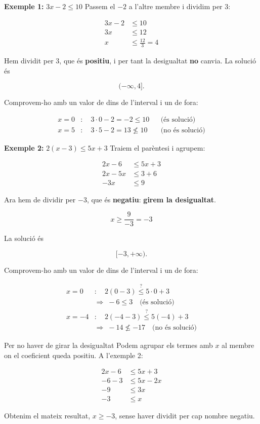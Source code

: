 \begin{exemple}{\textbf{Exemple 1:} $3x-2\leq 10$}
Passem el $-2$ a l'altre membre i dividim per $3$:

\[
\begin{aligned}
3x-2&\leq 10\\
3x&\leq 12\\
x&\leq \frac{12}{3}=4
\end{aligned}
\]

Hem dividit per $3$, que és \textbf{positiu}, i per tant la desigualtat \textbf{no} canvia. La solució és

\[
(-\infty,4].
\]

Comprovem-ho amb un valor de dins de l'interval i un de fora:

\[
\begin{aligned}
x=0&:\quad 3\cdot 0-2=-2\leq 10 &&\text{(és solució)}\\
x=5&:\quad 3\cdot 5-2=13\not\leq 10 &&\text{(no és solució)}
\end{aligned}
\]
\end{exemple}

\begin{exemple}{\textbf{Exemple 2:} $2(x-3)\leq 5x+3$}
Traiem el parèntesi i agrupem:

\[
\begin{aligned}
2x-6&\leq 5x+3\\
2x-5x&\leq 3+6\\
-3x&\leq 9
\end{aligned}
\]

Ara hem de dividir per $-3$, que és \textbf{negatiu}: \textbf{girem la desigualtat}.

\[
x\geq \frac{9}{-3}=-3
\]

La solució és

\[
[-3,+\infty).
\]

Comprovem-ho amb un valor de dins de l'interval i un de fora:

\[
\begin{aligned}
x=0&:\quad 2(0-3)\overset{?}{\leq} 5\cdot 0+3\\
&\Rightarrow\; -6\leq 3 \quad\text{(és solució)}\\[6pt]
x=-4&:\quad 2(-4-3)\overset{?}{\leq} 5(-4)+3\\
&\Rightarrow\; -14\not\leq -17 \quad\text{(no és solució)}
\end{aligned}
\]
\end{exemple}

\begin{propietat}{Per no haver de girar la desigualtat}
Podem agrupar els termes amb $x$ al membre on el coeficient queda positiu. A l'exemple 2:

\[
\begin{aligned}
2x-6&\leq 5x+3\\
-6-3&\leq 5x-2x\\
-9&\leq 3x\\
-3&\leq x
\end{aligned}
\]

Obtenim el mateix resultat, $x\geq -3$, sense haver dividit per cap nombre negatiu.
\end{propietat}

